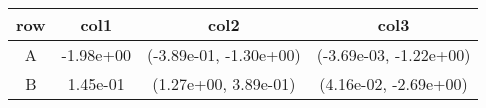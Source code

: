 \begin{tabular}{cccc}
\toprule
row&col1&col2&col3\tabularnewline
\midrule
A&-1.98e+00& (-3.89e-01, -1.30e+00)& (-3.69e-03, -1.22e+00)\tabularnewline
B&1.45e-01& (1.27e+00, 3.89e-01)& (4.16e-02, -2.69e+00)\tabularnewline
\bottomrule
\end{tabular}
